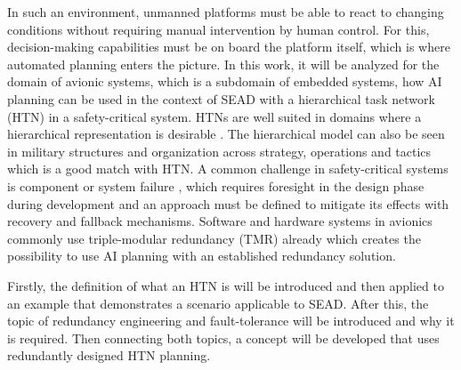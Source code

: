 In such an environment, unmanned platforms must be able to react to changing conditions without requiring manual intervention by human control. For this, decision-making capabilities must be on board the platform itself, which is where automated planning enters the picture. In this work, it will be analyzed for the domain of avionic systems, which is a subdomain of embedded systems, how AI planning can be used in the context of SEAD with a hierarchical task network (HTN) in a safety-critical system. HTNs are well suited in domains where a hierarchical representation is desirable \parencite{georgievski_htn_2015}. The hierarchical model can also be seen in military structures and organization across strategy, operations and tactics \parencite{nagele_colonels_2023} which is a good match with HTN. A common challenge in safety-critical systems is component or system failure \parencite{maurya_reliability_2020}, which requires foresight in the design phase during development and an approach must be defined to mitigate its effects with recovery and fallback mechanisms. Software and hardware systems in avionics commonly use triple-modular redundancy (TMR) already \parencite{yeh_triple-triple_1996, ahlstrom_redundancy_2002, kadry_reliability_2015} which creates the possibility to use AI planning with an established redundancy solution.

Firstly, the definition of what an HTN is will be introduced and then applied to an example that demonstrates a scenario applicable to SEAD. After this, the topic of redundancy engineering and fault-tolerance will be introduced and why it is required. Then connecting both topics, a concept will be developed that uses redundantly designed HTN planning.

